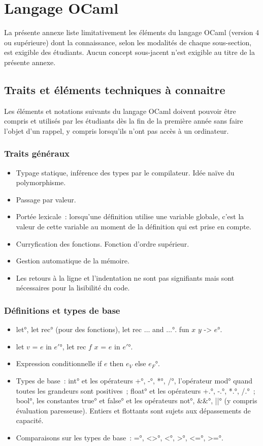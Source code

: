 \section{Langage OCaml}\label{annexe-ocaml}
La présente annexe liste limitativement les éléments du langage OCaml (version 4 ou supérieure) dont la connaissance, selon les modalités de chaque sous-section, est exigible des étudiants. Aucun concept sous-jacent n'est exigible au titre de la présente annexe.


\subsection{Traits et éléments techniques à connaitre}
Les éléments et notations suivants du langage OCaml doivent pouvoir être compris et utilisés par les étudiants dès la fin de la première année sans faire l'objet d'un rappel, y compris lorsqu'ils n'ont pas accès à un ordinateur.

\subsubsection*{Traits généraux}
\begin{itemize}
\item Typage statique, inférence des types par le compilateur. Idée naïve du polymorphisme.
\item Passage par valeur.
\item Portée lexicale~: lorsqu'une définition utilise une variable globale, c'est la valeur de cette variable au moment de la définition qui est prise en compte.
\item Curryfication des fonctions. Fonction d'ordre supérieur.
\item Gestion automatique de la mémoire.
\item Les retours à la ligne et l'indentation ne sont pas signifiants mais sont nécessaires pour la lisibilité du code.
\end{itemize}

\subsubsection*{Définitions et types de base}
\begin{itemize}
\item \°let°, \°let rec° (pour des fonctions), \°let rec $\dots$ and $\dots$°. \°fun $x$ $y$ -> $e$°.
\item \°let $v$ = $e$ in $e'$°, \°let rec $f$ $x$ = $e$ in $e'$°.
\item Expression conditionnelle \°if $e$ then $e_V$ else $e_F$°.
\item 
Types de base~: \°int° et les opérateurs \°+°, \°-°, \°*°, \°/°, l'opérateur \°mod° quand toutes les grandeurs sont positives~; \°float° et les opérateurs \°+.°, \°-.°, \°*.°, \°/.°~; \°bool°, les constantes \°true° et \°false° et les opérateurs \°not°, \°&&°, \°||° (y compris évaluation paresseuse). Entiers et flottants sont sujets aux dépassements de capacité.
\item Comparaisons sur les types de base~: \°=°, \°<>°, \°<°, \°>°, \°<=°, \°>=°.

\end{itemize}

